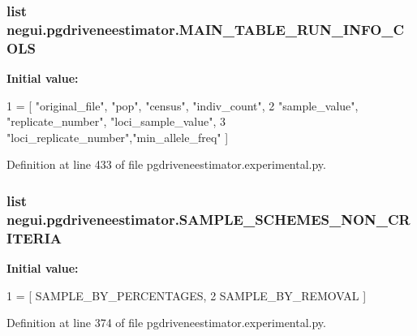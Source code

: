 \subsubsection[{\texorpdfstring{M\+A\+I\+N\+\_\+\+T\+A\+B\+L\+E\+\_\+\+R\+U\+N\+\_\+\+I\+N\+F\+O\+\_\+\+C\+O\+LS}{MAIN_TABLE_RUN_INFO_COLS}}]{\setlength{\rightskip}{0pt plus 5cm}list negui.\+pgdriveneestimator.\+M\+A\+I\+N\+\_\+\+T\+A\+B\+L\+E\+\_\+\+R\+U\+N\+\_\+\+I\+N\+F\+O\+\_\+\+C\+O\+LS}\hypertarget{namespacenegui_1_1pgdriveneestimator_a7d21ac3784419638647683e99b085cc0}{}\label{namespacenegui_1_1pgdriveneestimator_a7d21ac3784419638647683e99b085cc0}
{\bfseries Initial value\+:}
\begin{DoxyCode}
1 = [ \textcolor{stringliteral}{"original\_file"}, \textcolor{stringliteral}{"pop"}, \textcolor{stringliteral}{"census"},   \textcolor{stringliteral}{"indiv\_count"}, 
2                             \textcolor{stringliteral}{"sample\_value"}, \textcolor{stringliteral}{"replicate\_number"}, \textcolor{stringliteral}{"loci\_sample\_value"}, 
3                             \textcolor{stringliteral}{"loci\_replicate\_number"},\textcolor{stringliteral}{"min\_allele\_freq"} ]
\end{DoxyCode}


Definition at line 433 of file pgdriveneestimator.\+experimental.\+py.

\subsubsection[{\texorpdfstring{S\+A\+M\+P\+L\+E\+\_\+\+S\+C\+H\+E\+M\+E\+S\+\_\+\+N\+O\+N\+\_\+\+C\+R\+I\+T\+E\+R\+IA}{SAMPLE_SCHEMES_NON_CRITERIA}}]{\setlength{\rightskip}{0pt plus 5cm}list negui.\+pgdriveneestimator.\+S\+A\+M\+P\+L\+E\+\_\+\+S\+C\+H\+E\+M\+E\+S\+\_\+\+N\+O\+N\+\_\+\+C\+R\+I\+T\+E\+R\+IA}\hypertarget{namespacenegui_1_1pgdriveneestimator_adb33149c6f4e36493056d012e2029270}{}\label{namespacenegui_1_1pgdriveneestimator_adb33149c6f4e36493056d012e2029270}
{\bfseries Initial value\+:}
\begin{DoxyCode}
1 = [ SAMPLE\_BY\_PERCENTAGES, 
2                                     SAMPLE\_BY\_REMOVAL ]
\end{DoxyCode}


Definition at line 374 of file pgdriveneestimator.\+experimental.\+py.

